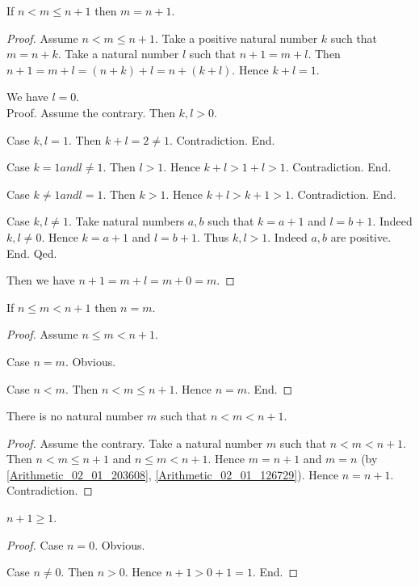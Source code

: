 \documentclass[../../arithmetic.tex]{subfiles}
\begin{document}
  \begin{forthel}
    \begin{proposition}\label{Arithmetic_02_01_203608}
      If $n < m \leq n + 1$ then $m = n + 1$.
    \end{proposition}
    \begin{proof}
      Assume $n < m \leq n + 1$.
      Take a positive natural number $k$ such that $m = n + k$.
      Take a natural number $l$ such that $n + 1 = m + l$.
      Then $n + 1 = m + l = (n + k) + l = n + (k + l)$.
      Hence $k + l = 1$.

      We have $l = 0$. \\
      Proof.
        Assume the contrary.
        Then $k,l > 0$.

        Case $k,l = 1$.
          Then $k + l = 2 \neq 1$.
          Contradiction.
        End.

        Case $k = 1 and l \neq 1$.
          Then $l > 1$.
          Hence $k + l > 1 + l > 1$.
          Contradiction.
        End.

        Case $k \neq 1 and l = 1$.
          Then $k > 1$.
          Hence $k + l > k + 1 > 1$.
          Contradiction.
        End.

        Case $k,l \neq 1$.
          Take natural numbers $a,b$ such that $k = a + 1$ and $l = b + 1$.
          Indeed $k,l \neq 0$.
          Hence $k = a + 1$ and $l = b + 1$.
          Thus $k,l > 1$. Indeed $a,b$ are positive.
        End.
      Qed.

      Then we have $n + 1 = m + l = m + 0 = m$.
    \end{proof}


    \begin{proposition}\label{Arithmetic_02_01_126729}
      If $n \leq m < n + 1$ then $n = m$.
    \end{proposition}
    \begin{proof}
      Assume $n \leq m < n + 1$.

      Case $n = m$. Obvious.

      Case $n < m$.
        Then $n < m \leq n + 1$.
        Hence $n = m$.
      End.
    \end{proof}


    \begin{corollary}\label{Arithmetic_02_01_666910}
      There is no natural number $m$ such that $n < m < n + 1$.
    \end{corollary}
    \begin{proof}
      Assume the contrary.
      Take a natural number $m$ such that $n < m < n + 1$.
      Then $n < m \leq n + 1$ and $n \leq m < n + 1$.
      Hence $m = n + 1$ and $m = n$ (by \ref{Arithmetic_02_01_203608}, \ref{Arithmetic_02_01_126729}).
      Hence $n = n + 1$.
      Contradiction.
    \end{proof}


    \begin{proposition}\label{Arithmetic_02_01_408119}
      $n + 1 \geq 1$.
    \end{proposition}
    \begin{proof}
      Case $n = 0$. Obvious.

      Case $n \neq 0$.
        Then $n > 0$.
        Hence $n + 1 > 0 + 1 = 1$.
      End.
    \end{proof}
  \end{forthel}
\end{document}
